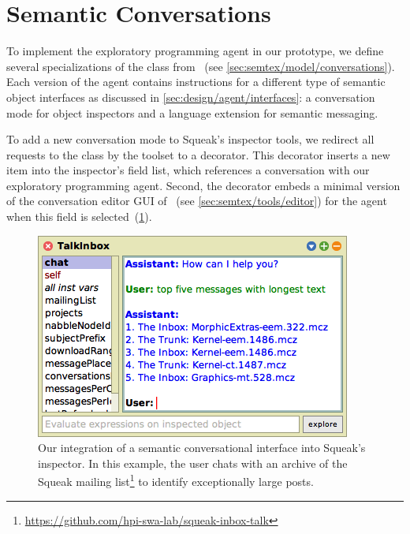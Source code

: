
\section{Semantic Conversations}
\label{sec:implementation/conversations}

To implement the exploratory programming agent in our prototype, we define several specializations of the  class from \semtex~(see \cref{sec:semtex/model/conversations}).
Each version of the agent contains instructions for a different type of semantic object interfaces as discussed in \cref{sec:design/agent/interfaces}: a conversation mode for object inspectors and a language extension for semantic messaging.

To add a new conversation mode to Squeak's inspector tools, we redirect all requests to the  class by the toolset to a decorator.
This decorator inserts a new  item into the inspector's field list, which references a conversation with our exploratory programming agent.
Second, the decorator embeds a minimal version of the conversation editor GUI of \semtex~(see \cref{sec:semtex/tools/editor}) for the agent when this field is selected~(\cref{fig:implementation/conversations/inspector}).

\begin{figure}
	\begin{minipage}{\textwidth}
		\centering
		\includegraphics[width=.7\textwidth]{03_conversations/inspector.png}
		\caption[Our integration of a semantic conversational interface into Squeak's inspector.]{
			Our integration of a semantic conversational interface into Squeak's inspector.
			In this example, the user chats with an archive of the Squeak mailing list\footnote{\url{https://github.com/hpi-swa-lab/squeak-inbox-talk}} to identify exceptionally large posts.
		}
		\label{fig:implementation/conversations/inspector}
	\end{minipage}
\end{figure}

